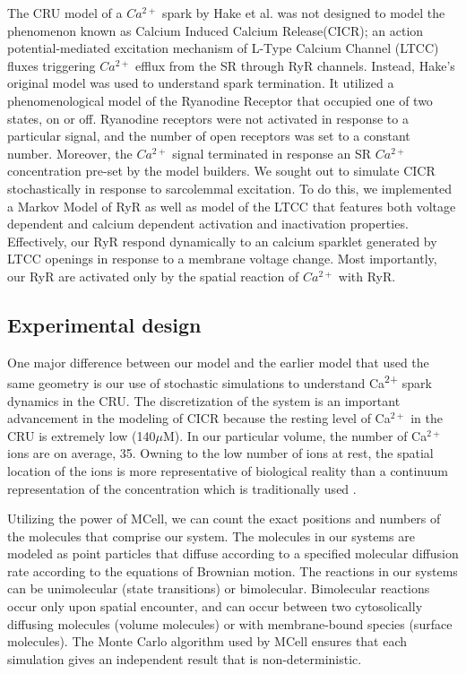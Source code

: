 \documentclass[12pt]{ucsddissertation}
\begin{document}
The CRU model of a $Ca^{2+}$ spark by Hake et al. \cite{Hake2012} was not designed to model the phenomenon known as Calcium Induced Calcium Release(CICR); an action potential-mediated excitation mechanism of L-Type Calcium Channel (LTCC) fluxes triggering $Ca^{2+}$ efflux from the SR through RyR channels. Instead, Hake's original model was used to understand spark termination. It utilized a phenomenological model of the Ryanodine Receptor that occupied one of two states, on or off. Ryanodine receptors were not activated in response to a particular signal, and the number of open receptors was set to a constant number. Moreover, the $Ca^{2+}$ signal terminated in response an SR $Ca^{2+}$ concentration pre-set by the model builders. We sought out to simulate CICR stochastically in response to sarcolemmal excitation. To do this, we implemented a Markov Model of RyR \cite{Saftenku2001} as well as model of the LTCC \cite{Greenstein2002} that features both voltage dependent and calcium dependent activation and inactivation properties. Effectively, our RyR respond dynamically to an calcium sparklet generated by LTCC openings in response to a membrane voltage change. Most importantly, our RyR are activated only by the spatial reaction of $Ca^{2+}$ with RyR.

\subsection{Experimental design}
One major difference between our model and the earlier model that used the same geometry \cite{Hake2012} is our use of stochastic simulations to understand Ca\textsuperscript{2+} spark dynamics in the CRU. The discretization of the system is an important advancement in the modeling of CICR because the resting level of Ca$^{2+}$ in the CRU is extremely low (140$\mu$M). In our particular volume, the number of Ca$^{2+}$ ions are on average, 35. Owning to the low number of ions at rest, the spatial location of the ions is more representative of biological reality than a continuum representation of the concentration which is traditionally used \cite{Maleckar2017}. 

Utilizing the power of MCell, we can count the exact positions and numbers of the molecules that comprise our system. The molecules in our systems are modeled as point particles that diffuse according to a specified molecular diffusion rate according to the equations of Brownian motion\cite{Stiles2001a}. The reactions in our systems can be unimolecular (state transitions) or bimolecular. Bimolecular reactions occur only upon spatial encounter, and can occur between two cytosolically diffusing molecules (volume molecules) or with membrane-bound species (surface molecules). The Monte Carlo algorithm used by MCell ensures that each simulation gives an independent result that is non-deterministic.
\end{document}
